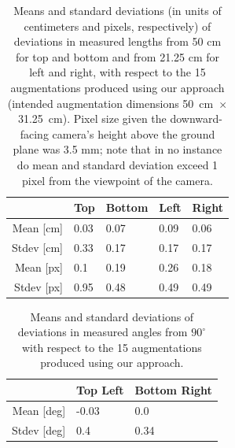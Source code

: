 \documentclass[review]{elsarticle}
\begin{document}
\begin{table}[ht]
\caption{Means and standard deviations (in units of centimeters and pixels, respectively) of deviations in measured lengths from 50 cm for top and bottom and from 21.25 cm for left and right, with respect to the 15 augmentations produced using our approach (intended augmentation dimensions 50~cm~$\times$~31.25~cm). Pixel size given the downward-facing camera's height above the ground plane was 3.5 mm; note that in no instance do mean and standard deviation exceed 1 pixel from the viewpoint of the camera.}
\label{table:length}
\centering
{\small
\begin{tabularx}{7.4cm}{r p{1cm} p{1cm} p{1cm} p{1cm}}
\toprule
  & Top & Bottom & Left & Right \\
\midrule
Mean {\tiny[cm]} & 0.03 & 0.07 & 0.09 & 0.06 \\
Stdev {\tiny[cm]} & 0.33 & 0.17 & 0.17 & 0.17 \\
\midrule
Mean {\tiny[px]} & 0.1 & 0.19 & 0.26 & 0.18 \\
Stdev {\tiny[px]} & 0.95 & 0.48 & 0.49 & 0.49 \\
\bottomrule
\end{tabularx}}
\end{table}

\begin{table}[ht]
\caption{Means and standard deviations of deviations in measured angles from $90^\circ{}$ with respect to the 15 augmentations produced using our approach.}
\label{table:angle}
\centering
{\small
\begin{tabularx}{6.75cm}{r p{1.95cm} p{1.95cm}}
\toprule
  & Top Left & Bottom Right \\
\midrule
Mean {\tiny[deg]} & -0.03 & 0.0 \\
Stdev {\tiny[deg]} & 0.4 & 0.34 \\
\bottomrule
\end{tabularx}}
\end{table}
\end{document}
